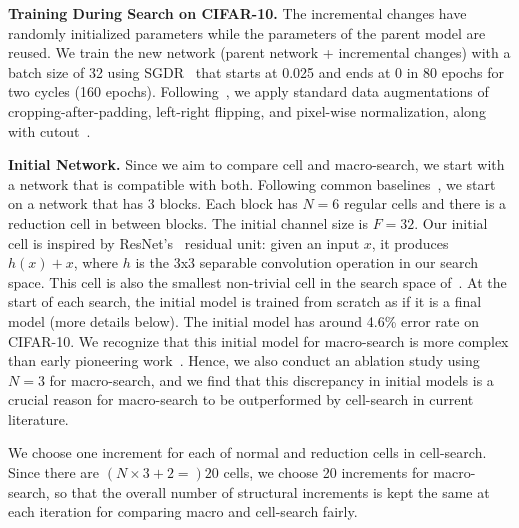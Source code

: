 \documentclass{article}
\begin{document}
\textbf{Training During Search on CIFAR-10.}
\label{sec:search_training}
The incremental changes have randomly initialized parameters while the parameters of the parent model are reused. We train the new network (parent network + incremental changes) with a batch size of 32 using SGDR~\citep{cosine_lr} that starts at 0.025 and ends at 0 in 80 epochs for two cycles (160 epochs). Following~\citep{Elsken2018EfficientMN}, we apply standard data augmentations of cropping-after-padding, left-right flipping, and pixel-wise normalization, along with cutout~\citep{cutout}.

\textbf{Initial Network.} 
\label{sec:init_network}
Since we aim to compare cell and macro-search, we start with a network that is compatible with both. Following common baselines~\citep{NASCell}, we start on a network that has 3 blocks. Each block has $N=6$ regular cells and there is a reduction cell in between blocks.
The initial channel size is $F=32$. Our initial cell is inspired by ResNet's~\citep{resnet} residual unit: given an input $x$, it produces $h(x) + x$, where $h$ is the 3x3 separable convolution operation in our search space. This cell is also the smallest non-trivial cell in the search space of~\citep{NASCell}. 
At the start of each search, the initial model is trained from scratch as if it is a final model (more details below). The initial model has around 4.6\% error rate on CIFAR-10. 
We recognize that this initial model for macro-search is more complex than early pioneering work~\citep{NAS,Real2017EvoNet}. Hence, we also conduct an ablation study using $N=3$ for macro-search, and we find that this discrepancy in initial models is a crucial reason for macro-search to be outperformed by cell-search in current literature. 

We choose one increment for each of normal and reduction cells in cell-search. Since there are $(N\times 3 + 2=)20$ cells, we choose 20 increments for macro-search, so that the overall number of structural increments is kept the same at each iteration for comparing macro and cell-search fairly.



\vspace{-3pt}
\end{document}
